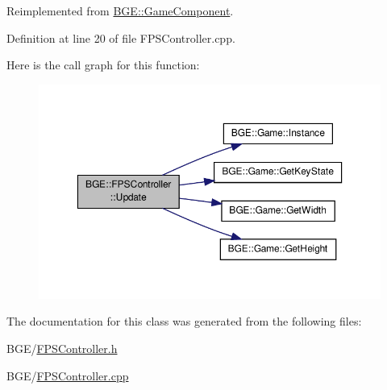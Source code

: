 Reimplemented from \hyperlink{class_b_g_e_1_1_game_component_ac8e444827ee0be9ad654cdff4d15f071}{B\-G\-E\-::\-Game\-Component}.



Definition at line 20 of file F\-P\-S\-Controller.\-cpp.



Here is the call graph for this function\-:
\nopagebreak
\begin{figure}[H]
\begin{center}
\leavevmode
\includegraphics[width=350pt]{class_b_g_e_1_1_f_p_s_controller_aeb3dc9b60c65a3f36fbd8c88e2257de3_cgraph}
\end{center}
\end{figure}




The documentation for this class was generated from the following files\-:\begin{DoxyCompactItemize}
\item 
B\-G\-E/\hyperlink{_f_p_s_controller_8h}{F\-P\-S\-Controller.\-h}\item 
B\-G\-E/\hyperlink{_f_p_s_controller_8cpp}{F\-P\-S\-Controller.\-cpp}\end{DoxyCompactItemize}
